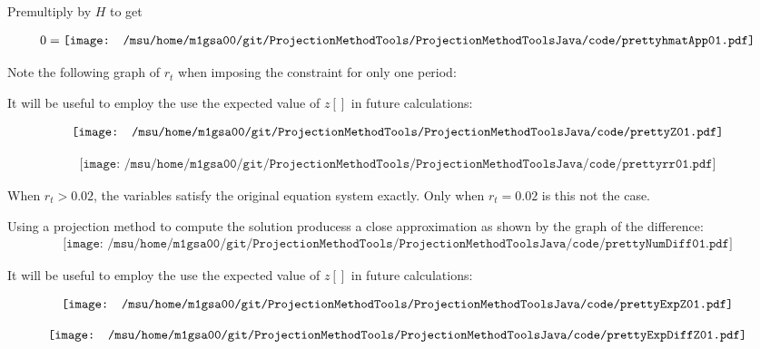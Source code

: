 \documentclass[12pt]{article}
\begin{document}
Premultiply by $H$ to get

\begin{gather*}
  0=\vcenter{\hbox{\texttt{[image: /msu/home/m1gsa00/git/ProjectionMethodTools/ProjectionMethodToolsJava/code/prettyhmatApp01.pdf]}}}
\end{gather*}

Note the following graph of $r_t$ when imposing the constraint for only one period:




It will be useful to employ the use the expected value of $z[]$ in future calculations:


\begin{gather*}
  \vcenter{\hbox{\texttt{[image: /msu/home/m1gsa00/git/ProjectionMethodTools/ProjectionMethodToolsJava/code/prettyZ01.pdf]}}}\\
\end{gather*}




\begin{gather*}
\texttt{[image: /msu/home/m1gsa00/git/ProjectionMethodTools/ProjectionMethodToolsJava/code/prettyrr01.pdf]}
\end{gather*}

When $r_t>0.02$, the variables satisfy the original equation system exactly.
Only when $r_t=0.02$ is this not the case.

Using a projection method to compute the solution producess a close approximation as shown by the graph of the difference:
\begin{gather*}
\texttt{[image: /msu/home/m1gsa00/git/ProjectionMethodTools/ProjectionMethodToolsJava/code/prettyNumDiff01.pdf]}
\end{gather*}



It will be useful to employ the use the expected value of $z[]$ in future calculations:


\begin{gather*}
  \vcenter{\hbox{\texttt{[image: /msu/home/m1gsa00/git/ProjectionMethodTools/ProjectionMethodToolsJava/code/prettyExpZ01.pdf]}}}\\
\end{gather*}

\begin{gather*}
  \vcenter{\hbox{\texttt{[image: /msu/home/m1gsa00/git/ProjectionMethodTools/ProjectionMethodToolsJava/code/prettyExpDiffZ01.pdf]}}}\\
\end{gather*}
\end{document}
